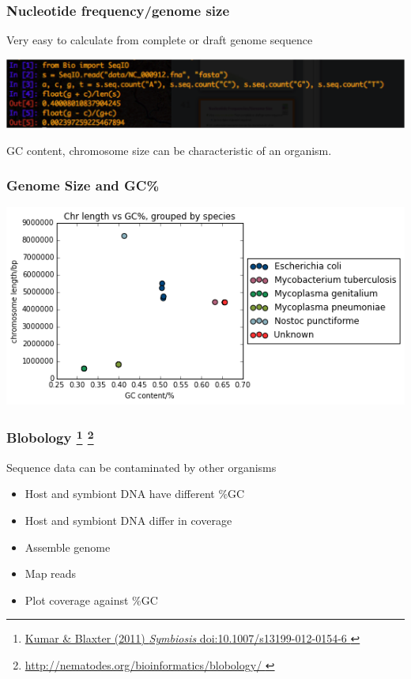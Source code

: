 %
\begin{frame}
  \frametitle{Nucleotide frequency/genome size}
  Very easy to calculate from complete or draft genome sequence \\
  \begin{center}
    \includegraphics[width=\textwidth]{images/python_gc} \\
  \end{center}  
  GC content, chromosome size can be characteristic of an organism.
\end{frame}

%
\begin{frame}
  \frametitle{Genome Size and GC\%}
  \begin{center}
    \includegraphics[width=\textwidth]{images/bacteria_gc_size}
  \end{center}
\end{frame}

%
\begin{frame}
  \frametitle{Blobology
  \footnote{\tiny{\href{http://dx.doi.org/10.1007/s13199-012-0154-6
}{Kumar \& Blaxter (2011) \textit{Symbiosis} doi:10.1007/s13199-012-0154-6
}}}
  \footnote{\tiny{\href{http://nematodes.org/bioinformatics/blobology/
}{http://nematodes.org/bioinformatics/blobology/
}}}  
  }
  Sequence data can be contaminated by other organisms
  \begin{itemize}
    \item \textcolor{hutton_green}{Host and symbiont DNA have different \%GC}
    \item \textcolor{hutton_green}{Host and symbiont DNA differ in coverage}
  \end{itemize}
      \begin{itemize}
        \item \textcolor{RawSienna}{Assemble genome}
        \item \textcolor{hutton_blue}{Map reads}
        \item \textcolor{hutton_purple}{Plot coverage against \%GC}
      \end{itemize}
\end{frame}

